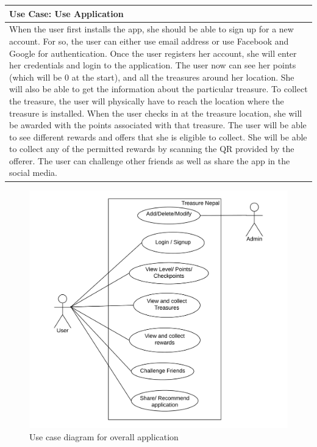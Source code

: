 \documentclass[12pt, a4paper, oneside]{article}
\begin{document}
\begin{table}[h!]
\centering
\begin{tabularx}{\linewidth}{|X|} 
\hline
\textbf{Use Case:  Use Application}\\ 
\hline
When the user first installs the app, she should be able to sign up for a new account. For so, the user can either use email address or use Facebook and Google for authentication. Once the user registers her account, she will enter her credentials and login to the application. The user now can see her points (which will be 0 at the start), and all the treasures around her location. She will also be able to get the information about the particular treasure. To collect the treasure, the user will physically have to reach the location where the treasure is installed. When the user checks in at the treasure location, she will be awarded with the points associated with that treasure. The user will be able to see different rewards and offers that she is eligible to collect. She will be able to collect any of the permitted rewards by scanning the QR provided by the offerer. The user can challenge other friends as well as share the app in the social media.\\
\hline
\end{tabularx}
\end{table}

\begin{figure}[h!]
\includegraphics[width=\linewidth]{use-case-diagrams/all.png}
\centering
\caption{Use case diagram for overall application}
\label{fig:use-case-all}
\end{figure}
\end{document}
